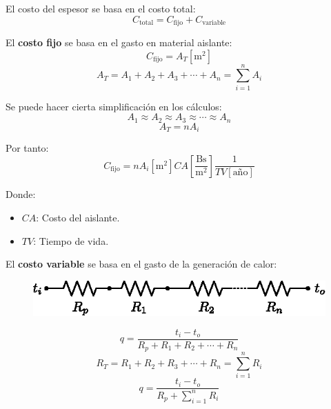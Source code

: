El costo del espesor se basa en el costo total:
\begin{equation}
    C_{\text{total}}=C_{\text{fijo}}+C_{\text{variable}}
\end{equation}

El \textbf{costo fijo} se basa en el gasto en material aislante:
\begin{equation*}
    C_{\text{fijo}}=A_T [\text{m}^2]
\end{equation*}
\begin{equation*}
    A_T=A_1+A_2+A_3+\cdots+A_n=\sum_{i=1}^n A_i
\end{equation*}

Se puede hacer cierta simplificación en los cálculos:
\begin{equation*}
    A_1\approx A_2\approx A_3\approx\cdots\approx A_n
\end{equation*}
\begin{equation*}
    A_T=nA_i
\end{equation*}

Por tanto:
\begin{equation*}
    C_{\text{fijo}}=nA_i[\text{m}^2]
    CA\left[\frac{\text{Bs}}{\text{m}^2}\right]
    \frac{1}{TV[\text{año}]}
\end{equation*}

Donde:
\begin{itemize}
    \item $CA$: Costo del aislante.
    \item $TV$: Tiempo de vida.
\end{itemize}

El \textbf{costo variable} se basa en el gasto de la generación de calor:
\begin{figure}[!h]
\centering
\includegraphics[scale=1.10]{figura02_16.eps}
\end{figure}

\begin{equation*}
    q=\frac{t_i-t_o}{R_p+R_1+R_2+\cdots+R_n}
\end{equation*}
\begin{equation*}
    R_T=R_1+R_2+R_3+\cdots+R_n=\sum_{i=1}^n R_i
\end{equation*}
\begin{equation*}
    q=\frac{t_i-t_o}{R_p+\sum_{i=1}^n R_i}
\end{equation*}

